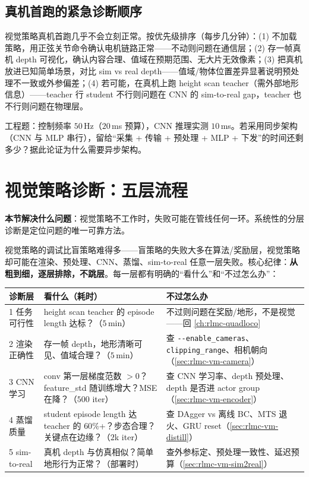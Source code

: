 \subsection{真机首跑的紧急诊断顺序}
\label{sec:rlmc-vm-firstrun}

视觉策略真机首跑几乎不会立刻正常。按优先级排序（每步几分钟）：(1) 不加载策略，用正弦关节命令确认电机链路正常——不动则问题在通信层；(2) 存一帧真机 depth 可视化，确认内容合理、值域在预期范围、无大片无效像素；(3) 把真机放进已知简单场景，对比 sim vs real depth——值域/物体位置差异显著说明预处理不一致或外参偏差；(4) 若可能，在真机上跑 height scan teacher（需外部地形信息）——teacher 行 student 不行则问题在 CNN 的 sim-to-real gap，teacher 也不行则问题在物理层。

\begin{practice}[延迟预算计算]
工程题：控制频率 $50$\,Hz（$20$\,ms 预算），CNN 推理实测 $10$\,ms。若采用同步架构（CNN 与 MLP 串行），留给“采集 + 传输 + 预处理 + MLP + 下发”的时间还剩多少？据此论证为什么需要异步架构。
\end{practice}

\section{视觉策略诊断：五层流程}
\label{sec:rlmc-vm-diag}

\textbf{本节解决什么问题}：视觉策略不工作时，失败可能在管线任何一环。系统性的分层诊断是定位问题的唯一可靠方法。

视觉策略的调试比盲策略难得多——盲策略的失败大多在算法/奖励层，视觉策略却可能在渲染、预处理、CNN、蒸馏、sim-to-real 任意一层失败。核心纪律：\textbf{从粗到细，逐层排除，不跳层}。每一层都有明确的“看什么”和“不过怎么办”：

\begin{center}
\small
\begin{tabular}{@{}p{2.2cm}p{4.2cm}p{5.0cm}@{}}
\toprule
诊断层 & 看什么（耗时） & 不过怎么办 \\
\midrule
1 任务可行性 & height scan teacher 的 episode length 达标？（$5$\,min） & 不过则问题在奖励/地形，不是视觉——回 \cref{ch:rlmc-quadloco} \\
2 渲染正确性 & 存一帧 depth，地形清晰可见、值域合理？（$5$\,min） & 查 \verb|--enable_cameras|、\verb|clipping_range|、相机朝向（\cref{sec:rlmc-vm-camera}） \\
3 CNN 学习 & conv 第一层梯度范数 $>0$？feature\_std 随训练增大？MSE 在降？（$500$ iter） & 查 CNN 学习率、depth 预处理、depth 是否进 actor group（\cref{sec:rlmc-vm-encoder}） \\
4 蒸馏质量 & student episode length 达 teacher 的 $60\%$+？步态合理？关键点在边缘？（$2$k iter） & 查 DAgger vs 离线 BC、MTS 退火、GRU reset（\cref{sec:rlmc-vm-distill}） \\
5 sim-to-real & 真机 depth 与仿真相似？简单地形行为正常？（部署时） & 查外参标定、预处理一致性、延迟预算（\cref{sec:rlmc-vm-sim2real}） \\
\bottomrule
\end{tabular}
\end{center}

